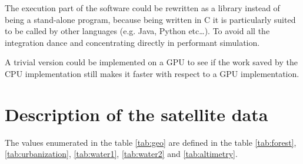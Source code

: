 \documentclass[Lau]{sapthesis} %
\def\section{\chapter}
\begin{document}
The execution part of the software could be rewritten as a library instead of
being a stand-alone program, because being written in C it is particularly
suited to be called by other languages (e.g. Java, Python etc\dots). To avoid
all the integration dance and concentrating directly in performant simulation.

A trivial version could be implemented on a GPU to see if the work saved by the
CPU implementation still makes it faster with respect to a GPU implementation.

\appendix

\section{Description of the satellite data}\label{sec:desc}

The values enumerated in the table \ref{tab:geo} are defined in the table
\ref{tab:forest}, \ref{tab:urbanization}, \ref{tab:water1}, \ref{tab:water2} and
\ref{tab:altimetry}.
\end{document}

